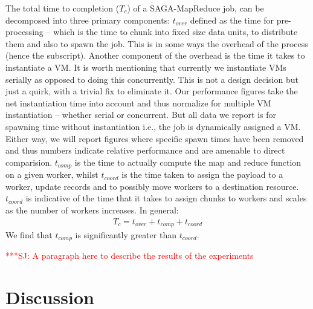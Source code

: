 \documentclass[conference,final]{IEEEtran}
\newcommand{\jhanote}[1]{ {\textcolor{red} { ***SJ: #1 }}}
\newcommand{\jhanote}[1]{}
\newcommand{\sagamapreduce }{SAGA-MapReduce }
\begin{document}
The total time to completion ($T_c$) of a \sagamapreduce job, can be
decomposed into three primary components: $t_{over}$ defined as the
time for pre-processing -- which is the time to chunk into fixed size
data units, to distribute them and also to spawn the job. This is in
some ways the overhead of the process (hence the subscript).  Another
component of the overhead is the time it takes to instantiate a VM. It
is worth mentioning that currently we instantiate VMs serially as
opposed to doing this concurrently. This is not a design decision but
just a quirk, with a trivial fix to eliminate it.  Our performance
figures take the net instantiation time into account and thus
normalize for multiple VM instantiation -- whether serial or
concurrent. But all data we report is for spawning time without
instantiation i.e., the job is dynamically assigned a VM.  Either way,
we will report figures where specific spawn times have been removed
and thus numbers indicate relative performance and are amenable to
direct comparision.  $t_{comp}$ is the time to actually compute the
map and reduce function on a given worker, whilst $t_{coord}$ is the
time taken to assign the payload to a worker, update records and to
possibly move workers to a destination resource. $t_{coord}$ is
indicative of the time that it takes to assign chunks to workers and
scales as the number of workers increases. In general:
\vspace{-1em}
\begin{eqnarray}
T_c = t_{over} + t_{comp} + t_{coord}
\end{eqnarray}
We find that $t_{comp}$ is significantly greater than $t_{coord}$.

\jhanote{A paragraph here to describe the results of the experiments}

\section{Discussion}

\end{document}
